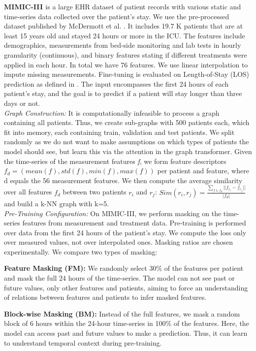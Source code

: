 \documentclass[runningheads]{llncs}
\begin{document}
\textbf{MIMIC-III \cite{mimic}} is a large EHR dataset of patient records with various static and time-series data collected over the patient’s stay. We use the pre-processed dataset published by McDermott et al. \cite{mcdermott2021EHRbenchmark}. It includes 19.7 K patients that are at least 15 years old and stayed 24 hours or more in the ICU. The features include demographics, measurements from bed-side monitoring and lab tests in hourly granularity (continuous), and binary features stating if different treatments were applied in each hour. In total we have 76 features. We use linear interpolation to impute missing measurements. Fine-tuning is evaluated on  Length-of-Stay (LOS) prediction as defined in \cite{mcdermott2021EHRbenchmark}. The input encompasses the first 24 hours of each patient’s stay, and the goal is to predict if a patient will stay longer than three days or not.\\
\textit{Graph Construction:}
It is computationally infeasible to process a graph containing all patients. Thus, we create sub-graphs with 500 patients each, which fit into memory, each containing train, validation and test patients. We split randomly as we do not want to make assumptions on which types of patients the model should see, but learn this via the attention in the graph transformer. Given the time-series of the measurement features \textit{f}, we form feature descriptors $f_d = (mean(f), std(f), min(f), max(f))$ per patient and feature, where d equals the 56 measurement features. We then compute the average similarity over all features $f_d$ between two patients $r_i$ and $r_j$: $Sim(r_i, r_j) = \frac{\sum_{f \in f_d}||f_{r_i} - f_{r_j}||}{|f_d|}
$
and build a k-NN graph with k=5.\\
\textit{Pre-Training Configuration:}
On MIMIC-III, we perform masking on the time-series features from measurement and treatment data. Pre-training is performed over data from the first 24 hours of the patient’s stay. We compute the loss only over measured values, not over interpolated ones. Masking ratios are chosen experimentally. We compare two types of masking:

\textbf{Feature Masking (FM):} We randomly select 30\% of the features per patient and mask the full 24 hours of the time-series. The model can not see past or future values, only other features and patients, aiming to force an understanding of relations between features and patients to infer masked features.

\textbf{Block-wise Masking (BM):} Instead of the full features, we mask a random block of 6 hours within the 24-hour time-series in 100\% of the features. Here, the model can access past and future values to make a prediction. Thus, it can learn to understand temporal context during pre-training.
\end{document}
